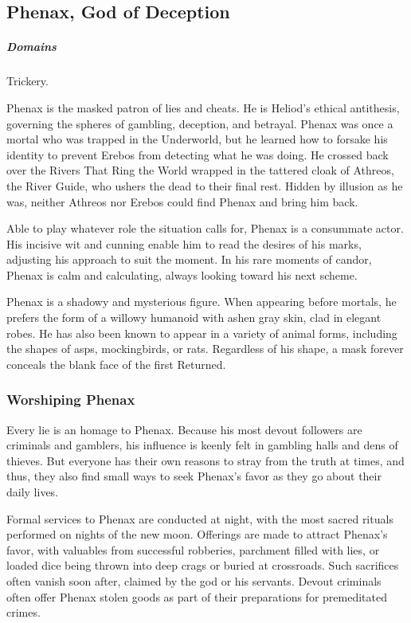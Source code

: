 \subsection*{Phenax, God of Deception} \label{ssec::phenax}
    \subparagraph{Domains} Trickery.

    Phenax is the masked patron of lies and cheats. He is Heliod's ethical antithesis, governing the spheres of gambling, deception, and betrayal. Phenax was once a mortal who was trapped in the Underworld, but he learned how to forsake his identity to prevent Erebos from detecting what he was doing. He crossed back over the Rivers That Ring the World wrapped in the tattered cloak of Athreos, the River Guide, who ushers the dead to their final rest. Hidden by illusion as he was, neither Athreos nor Erebos could find Phenax and bring him back.

    Able to play whatever role the situation calls for, Phenax is a consummate actor. His incisive wit and cunning enable him to read the desires of his marks, adjusting his approach to suit the moment. In his rare moments of candor, Phenax is calm and calculating, always looking toward his next scheme.

    Phenax is a shadowy and mysterious figure. When appearing before mortals, he prefers the form of a willowy humanoid with ashen gray skin, clad in elegant robes. He has also been known to appear in a variety of animal forms, including the shapes of asps, mockingbirds, or rats. Regardless of his shape, a mask forever conceals the blank face of the first Returned.

    \subsubsection{Worshiping Phenax}
        Every lie is an homage to Phenax. Because his most devout followers are criminals and gamblers, his influence is keenly felt in gambling halls and dens of thieves. But everyone has their own reasons to stray from the truth at times, and thus, they also find small ways to seek Phenax's favor as they go about their daily lives.

        Formal services to Phenax are conducted at night, with the most sacred rituals performed on nights of the new moon. Offerings are made to attract Phenax's favor, with valuables from successful robberies, parchment filled with lies, or loaded dice being thrown into deep crags or buried at crossroads. Such sacrifices often vanish soon after, claimed by the god or his servants. Devout criminals often offer Phenax stolen goods as part of their preparations for premeditated crimes.

